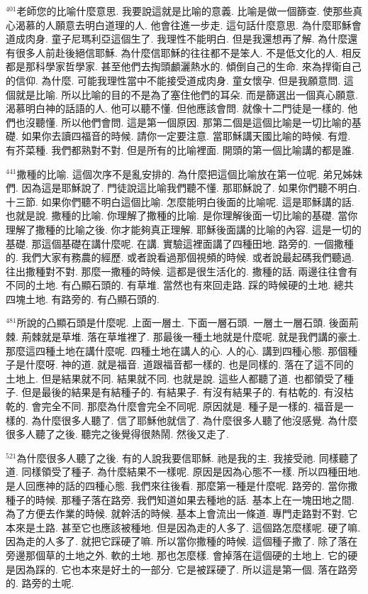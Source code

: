 \documentclass{book}
\begin{document}
$^{401}$老師您的比喻什麼意思.
我要說這就是比喻的意義.
比喻是做一個篩查.
使那些真心渴慕的人願意去明白道理的人.
他會往進一步走.
這句話什麼意思.
為什麼耶穌會道成肉身.
童子尼瑪利亞這個生了.
我理性不能明白.
但是我還想再了解.
為什麼還有很多人前赴後絕信耶穌.
為什麼信耶穌的往往都不是笨人.
不是低文化的人.
相反都是那科學家哲學家.
甚至他們去掏頭顱灑熱水的.
傾倒自己的生命.
來為捍衛自己的信仰.
為什麼.
可能我理性當中不能接受道成肉身.
童女懷孕.
但是我願意問.
這個就是比喻.
所以比喻的目的不是為了塞住他們的耳朵.
而是篩選出一個真心願意.
渴慕明白神的話語的人.
他可以聽不懂.
但他應該會問.
就像十二門徒是一樣的.
他們也沒聽懂.
所以他們會問.
這是第一個原因.
那第二個是這個比喻是一切比喻的基礎.
如果你去讀四福音的時候.
請你一定要注意.
當耶穌講天國比喻的時候.
有燈.
有芥菜種.
我們都熟對不對.
但是所有的比喻裡面.
開頭的第一個比喻講的都是誰.

$^{441}$撒種的比喻.
這個次序不是亂安排的.
為什麼把這個比喻放在第一位呢.
弟兄姊妹們.
因為這是耶穌說了.
門徒說這比喻我們聽不懂.
那耶穌說了.
如果你們聽不明白.
十三節.
如果你們聽不明白這個比喻.
怎麼能明白後面的比喻呢.
這是耶穌講的話.
也就是說.
撒種的比喻.
你理解了撒種的比喻.
是你理解後面一切比喻的基礎.
當你理解了撒種的比喻之後.
你才能夠真正理解.
耶穌後面講的比喻的內容.
這是一切的基礎.
那這個基礎在講什麼呢.
在講.
實驗這裡面講了四種田地.
路旁的.
一個撒種的.
我們大家有務農的經歷.
或者說看過那個視頻的時候.
或者說最起碼我們聽過.
往出撒種對不對.
那麼一撒種的時候.
這都是很生活化的.
撒種的話.
兩邊往往會有不同的土地.
有凸顯石頭的.
有草堆.
當然也有來回走路.
踩的時候硬的土地.
總共四塊土地.
有路旁的.
有凸顯石頭的.

$^{481}$所說的凸顯石頭是什麼呢.
上面一層土.
下面一層石頭.
一層土一層石頭.
後面荊棘.
荊棘就是草堆.
落在草堆裡了.
那最後一種土地就是什麼呢.
就是我們講的豪土.
那麼這四種土地在講什麼呢.
四種土地在講人的心.
人的心.
講到四種心態.
那個種子是什麼呀.
神的道.
就是福音.
道跟福音都一樣的.
也是同樣的.
落在了這不同的土地上.
但是結果就不同.
結果就不同.
也就是說.
這些人都聽了道.
也都領受了種子.
但是最後的結果是有結種子的.
有結果子.
有沒有結果子的.
有枯乾的.
有沒枯乾的.
會完全不同.
那麼為什麼會完全不同呢.
原因就是.
種子是一樣的.
福音是一樣的.
為什麼很多人聽了.
信了耶穌他就信了.
為什麼很多人聽了他沒感覺.
為什麼很多人聽了之後.
聽完之後覺得很熱鬧.
然後又走了.

$^{521}$為什麼很多人聽了之後.
有的人說我要信耶穌.
祂是我的主.
我接受祂.
同樣聽了道.
同樣領受了種子.
為什麼結果不一樣呢.
原因是因為心態不一樣.
所以四種田地.
是人回應神的話的四種心態.
我們來往後看.
那麼第一種是什麼呢.
路旁的.
當你撒種子的時候.
那種子落在路旁.
我們知道如果去種地的話.
基本上在一塊田地之間.
為了方便去作業的時候.
就幹活的時候.
基本上會流出一條道.
專門走路對不對.
它本來是土路.
甚至它也應該被種地.
但是因為走的人多了.
這個路怎麼樣呢.
硬了嘛.
因為走的人多了.
就把它踩硬了嘛.
所以當你撒種的時候.
這個種子撒了.
除了落在旁邊那個草的土地之外.
軟的土地.
那也怎麼樣.
會掉落在這個硬的土地上.
它的硬是因為踩的.
它也本來是好土的一部分.
它是被踩硬了.
所以這是第一個.
落在路旁的.
路旁的土呢.
\end{document}
